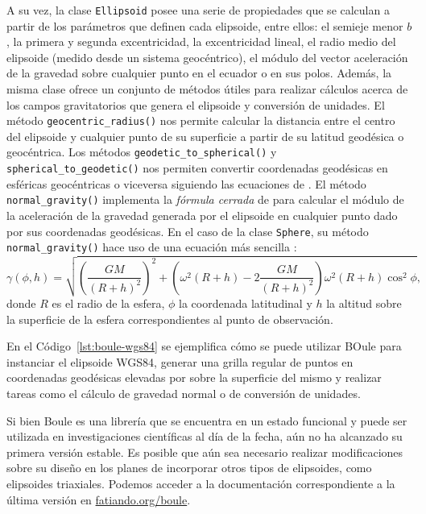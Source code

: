 A su vez, la clase \texttt{Ellipsoid} posee una serie de propiedades que se
calculan a partir de los parámetros que definen cada elipsoide, entre ellos: el
semieje menor $b$, la primera y segunda excentricidad, la excentricidad lineal,
el radio medio del elipsoide (medido desde un sistema geocéntrico), el módulo
del vector aceleración de la gravedad sobre cualquier punto en el ecuador o en
sus polos.
Además, la misma clase ofrece un conjunto de métodos útiles para realizar
cálculos acerca de los campos gravitatorios que genera el elipsoide
y conversión de unidades.
El método \texttt{geocentric\_radius()} nos permite calcular la distancia entre
el centro del elipsoide y cualquier punto de su superficie a partir de su
latitud geodésica o geocéntrica.
Los métodos \texttt{geodetic\_to\_spherical()}
y \texttt{spherical\_to\_geodetic()} nos permiten convertir coordenadas
geodésicas en esféricas geocéntricas o viceversa siguiendo las ecuaciones de
\citet{vermeille2002}.
El método \texttt{normal\_gravity()} implementa la \emph{fórmula cerrada} de
\citet{li2001a} para calcular el módulo de la aceleración de la gravedad
generada por el elipsoide en cualquier punto dado por sus coordenadas
geodésicas.
En el caso de la clase \texttt{Sphere}, su método \texttt{normal\_gravity()}
hace uso de una ecuación más sencilla \citep{heiskanen1967}:
%
\begin{equation}
    \gamma(\phi, h) =
        \sqrt{\left( \frac{GM}{(R + h)^2} \right)^2
        + \left(\omega^2 (R + h) - 2\frac{GM}{(R + h)^2} \right)
        \omega^2 (R + h) \cos^2 \phi},
\end{equation}
%
donde $R$ es el radio de la esfera, $\phi$ la coordenada latitudinal
y $h$ la altitud sobre la superficie de la esfera correspondientes al punto de
observación.



En el Código~\ref{lst:boule-wgs84} se ejemplifica cómo se puede utilizar BOule para
instanciar el elipsoide WGS84, generar una grilla regular de puntos en
coordenadas geodésicas elevadas por sobre la superficie del mismo y realizar
tareas como el cálculo de gravedad normal o de conversión de unidades.

Si bien Boule es una librería que se encuentra en un estado funcional
y puede ser utilizada en investigaciones científicas al día de la fecha, aún no
ha alcanzado su primera versión estable.
Es posible que aún sea necesario realizar modificaciones sobre su diseño en los
planes de incorporar otros tipos de elipsoides, como elipsoides
triaxiales.
Podemos acceder a la documentación correspondiente a la última versión en
\href{https://www.fatiando.org/boule}{fatiando.org/boule}.


